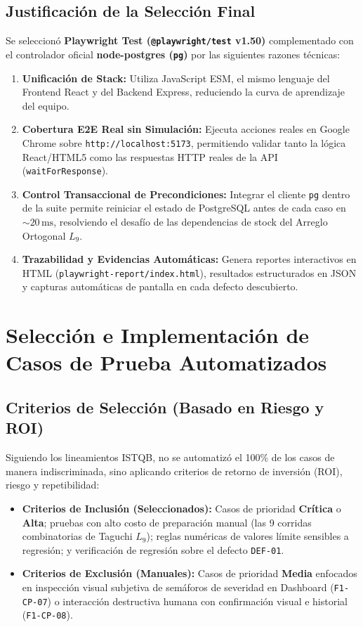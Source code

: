 \documentclass[11pt,a4paper]{article}
\begin{document}
\subsection{Justificación de la Selección Final}
Se seleccionó \textbf{Playwright Test (\texttt{@playwright/test} v1.50)} complementado con el controlador oficial \textbf{node-postgres (\texttt{pg})} por las siguientes razones técnicas:
\begin{enumerate}[noitemsep]
    \item \textbf{Unificación de Stack:} Utiliza JavaScript ESM, el mismo lenguaje del Frontend React y del Backend Express, reduciendo la curva de aprendizaje del equipo.
    \item \textbf{Cobertura E2E Real sin Simulación:} Ejecuta acciones reales en Google Chrome sobre \texttt{http://localhost:5173}, permitiendo validar tanto la lógica React/HTML5 como las respuestas HTTP reales de la API (\texttt{waitForResponse}).
    \item \textbf{Control Transaccional de Precondiciones:} Integrar el cliente \texttt{pg} dentro de la suite permite reiniciar el estado de PostgreSQL antes de cada caso en $\sim 20\,\text{ms}$, resolviendo el desafío de las dependencias de stock del Arreglo Ortogonal $L_9$.
    \item \textbf{Trazabilidad y Evidencias Automáticas:} Genera reportes interactivos en HTML (\texttt{playwright-report/index.html}), resultados estructurados en JSON y capturas automáticas de pantalla en cada defecto descubierto.
\end{enumerate}

\section{Selección e Implementación de Casos de Prueba Automatizados}

\subsection{Criterios de Selección (Basado en Riesgo y ROI)}
Siguiendo los lineamientos ISTQB, no se automatizó el 100\% de los casos de manera indiscriminada, sino aplicando criterios de retorno de inversión (ROI), riesgo y repetibilidad:
\begin{itemize}[noitemsep]
    \item \textbf{Criterios de Inclusión (Seleccionados):} Casos de prioridad \textbf{Crítica} o \textbf{Alta}; pruebas con alto costo de preparación manual (las 9 corridas combinatorias de Taguchi $L_9$); reglas numéricas de valores límite sensibles a regresión; y verificación de regresión sobre el defecto \texttt{DEF-01}.
    \item \textbf{Criterios de Exclusión (Manuales):} Casos de prioridad \textbf{Media} enfocados en inspección visual subjetiva de semáforos de severidad en Dashboard (\texttt{F1-CP-07}) o interacción destructiva humana con confirmación visual e historial (\texttt{F1-CP-08}).
\end{itemize}
\end{document}

